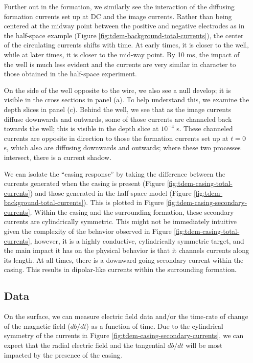 Further out in the formation, we similarly see the interaction of the diffusing formation currents set up at DC and the image currents. Rather than being centered at the midway point between the positive and negative electrodes as in the half-space example (Figure \ref{fig:tdem-background-total-currents}), the center of the circulating currents shifts with time. At early times, it is closer to the well, while at later times, it is closer to the mid-way point. By 10 ms, the impact of the well is much less evident and the currents are very similar in character to those obtained in the half-space experiment.

On the side of the well opposite to the wire, we also see a null develop; it is visible in the cross sections in panel (a). To help understand this, we examine the depth slices in panel (c). Behind the well, we see that as the image currents diffuse downwards and outwards, some of those currents are channeled back towards the well; this is visible in the depth slice at $10^{-4}$ s. These channeled currents are opposite in direction to those the formation currents set up at $t=$0 s, which also are diffusing downwards and outwards; where these two processes intersect, there is a current shadow.

We can isolate the ``casing response'' by taking the difference between the currents generated when the casing is present (Figure \ref{fig:tdem-casing-total-currents}) and those generated in the half-space model (Figure \ref{fig:tdem-background-total-currents}). This is plotted in Figure \ref{fig:tdem-casing-secondary-currents}. Within the casing and the surrounding formation, these secondary currents are cylindrically symmetric. This might not be immediately intuitive given the complexity of the behavior observed in Figure \ref{fig:tdem-casing-total-currents}, however, it is a highly conductive, cylindrically symmetric target, and the main impact it has on the physical behavior is that it channels currents along its length. At all times, there is a downward-going secondary current within the casing. This results in dipolar-like currents within the surrounding formation.




\subsection{Data}

On the surface, we can measure electric field data and/or the time-rate of change of the magnetic field ($db/dt$) as a function of time. Due to the cylindrical symmetry of the currents in Figure \ref{fig:tdem-casing-secondary-currents}, we can expect that the radial electric field and the tangential $db/dt$ will be most impacted by the presence of the casing.

